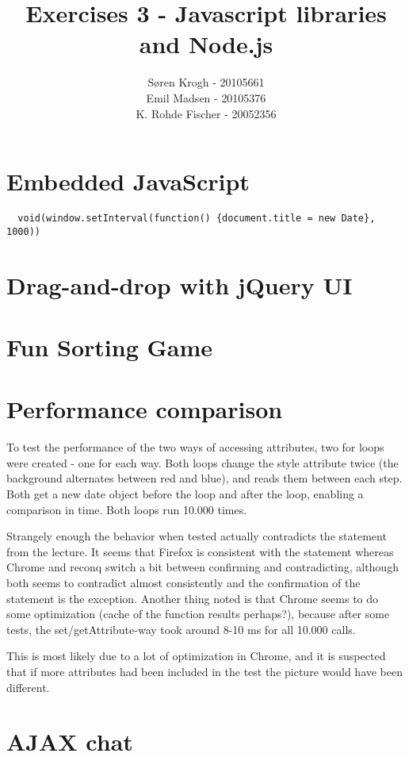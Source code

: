\documentclass[a4paper,10pt]{article}
\author{
Søren Krogh -  20105661 \\
Emil Madsen - 20105376  \\
K. Rohde Fischer - 20052356\\}
\title{Exercises 3 - Javascript libraries and Node.js}
\begin{document}
\maketitle

\section*{Embedded JavaScript}

\begin{verbatim}
  void(window.setInterval(function() {document.title = new Date}, 1000))
\end{verbatim}


\section*{Drag-and-drop with jQuery UI}


\section*{Fun Sorting Game}

\section*{Performance comparison}
To test the performance of the two ways of accessing attributes, two
for loops were created - one for each way.  Both loops change the
style attribute twice (the background alternates between red and
blue), and reads them between each step.  Both get a new date object
before the loop and after the loop, enabling a comparison in time.
Both loops run 10.000 times.

Strangely enough the behavior when tested actually contradicts the
statement from the lecture.  It seems that Firefox is consistent with
the statement whereas Chrome and reconq switch a bit between
confirming and contradicting, although both seems to contradict almost
consistently and the confirmation of the statement is the exception.
Another thing noted is that Chrome seems to do some optimization
(cache of the function results perhaps?), because after some tests,
the set/getAttribute-way took around 8-10 ms for all 10.000 calls.

This is most likely due to a lot of optimization in Chrome, and it is
suspected that if more attributes had been included in the test the
picture would have been different.

\section*{AJAX chat}
\end{document}
